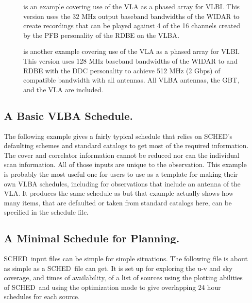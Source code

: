 \documentclass{report}
\newcommand{\sched}{{\sc SCHED}}
\newcommand{\schedb}{{\sc SCHED~}}
\begin{document}
\begin{description}
\item[] is
an example covering use of the VLA as a phased array for VLBI.  This
version uses the 32 MHz output baseband bandwidths of the WIDAR to
create recordings that can be played against 4 of the 16 channels
created by the PFB personality of the RDBE on the VLBA.

\item[] is
another example covering use of the VLA as a phased array for VLBI.  This
version uses 128 MHz baseband bandwidths of the WIDAR to and RDBE with
the DDC personality to achieve 512 MHz (2 Gbps) of compatible bandwidth
with all antennas.  All VLBA antennas, the GBT, and the VLA are included.


\end{description}

\subsection{\label{SSEC:EXAMPLE1}A Basic VLBA Schedule.}

The following example gives a fairly typical schedule that relies on
\sched's defaulting schemes and standard catalogs to get most of the
required information.  The cover and correlator information cannot be
reduced nor can the individual scan information.  All of those inputs
are unique to the observation.  This example is probably the most
useful one for users to use as a template for making their own
VLBA schedules, including for observations that include an antenna
of the VLA.  It produces the same schedule as  but that example actually
shows how many items, that are defaulted or taken from standard
catalogs here, can be specified in the schedule file.




\subsection{\label{SSEC:EXAMPLE3}A Minimal Schedule for Planning.}

\schedb input files can be simple for simple situations.  The
following file is about as simple as a \schedb file can get.  It is
set up for exploring the u-v and sky coverage, and times of
availability, of a list of sources using the plotting abilities of
\schedb and using the  optimization
mode to give overlapping 24 hour schedules for each source.
\end{document}
